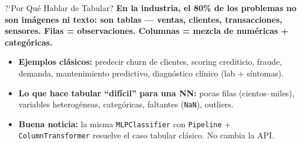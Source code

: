\documentclass[aspectratio=169, 11pt]{beamer}
\begin{document}
\begin{frame}{?`Por Qu\'e Hablar de Tabular?}
  \vspace{-4pt}
  {\footnotesize\color{arcaDark}\bfseries
    En la industria, el 80\% de los problemas no son im\'agenes ni texto:
    son \textbf{tablas} --- ventas, clientes, transacciones, sensores.
    Filas = observaciones. Columnas = mezcla de num\'ericas + categ\'oricas.}

  \vspace{6pt}
  {\footnotesize
  \begin{itemize}\setlength{\itemsep}{4pt}
    \item[{\color{arcaRed}\scriptsize\faArrowRight}]
      \textbf{Ejemplos cl\'asicos:} predecir churn de clientes, scoring
      crediticio, fraude, demanda, mantenimiento predictivo,
      diagn\'ostico cl\'inico (lab + s\'intomas).
    \item[{\color{arcaRed}\scriptsize\faArrowRight}]
      \textbf{Lo que hace tabular ``dif\'icil'' para una NN:}
      pocas filas (cientos--miles), variables heterog\'eneas,
      categ\'oricas, faltantes (\texttt{NaN}), outliers.
    \item[{\color{codeGreen}\scriptsize\faArrowRight}]
      \textbf{Buena noticia:} la misma \texttt{MLPClassifier} con
      \texttt{Pipeline} + \texttt{ColumnTransformer} resuelve el caso
      tabular cl\'asico. No cambia la API.
  \end{itemize}
  }
\end{frame}
\end{document}
